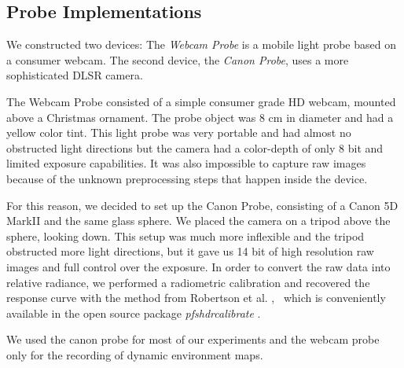  \subsection{Probe Implementations}
  \label{sec:probeimplementation}
 
 We constructed two devices: The \emph{Webcam Probe} is a mobile light probe based on a consumer webcam.
  The second device, the \emph{Canon Probe}, uses a more sophisticated DLSR camera.
 
 The Webcam Probe consisted of a simple consumer grade HD webcam, mounted above a Christmas ornament. The probe object was 8 cm in diameter and had a yellow color tint.
 This light probe was very portable and had almost no obstructed light directions but the camera had a color-depth of only 8 bit and limited exposure capabilities.
 It was also impossible to capture raw images because of the unknown preprocessing steps that happen inside the device.
 
 For this reason, we decided to set up the Canon Probe, consisting of a Canon 5D MarkII and the same glass sphere. 
 We placed the camera on a tripod above the sphere, looking down.
 This setup was much more inflexible and the tripod obstructed more light directions, but it gave us 14 bit of high resolution raw images and full control over the exposure.
 In order to convert the raw data into relative radiance, we performed a radiometric calibration and recovered the response curve with the method from Robertson et al. \cite{robertson1999dynamic}, \
  which is conveniently available in the open source package \emph{pfshdrcalibrate} \cite{PFS}.

 We used the canon probe for most of our experiments and the webcam probe only for the recording of dynamic environment maps.  
 
